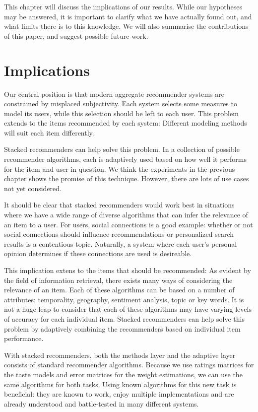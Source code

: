 \label{chap:discussion}

This chapter will discuss the implications of our results.
While our hypotheses may be answered,
it is important to clarify what we have actually found out,
and what limits there is to this knowledge.
We will also summarise the contributions of this paper,
and suggest possible future work.


\section{Implications}      

Our central position is that modern aggregate recommender systems 
are constrained by misplaced subjectivity.
Each system selects some measures to model its users, while this selection should be left to each user.
This problem extends to the items recommended by each system: 
Different modeling methods will suit each item differently.

Stacked recommenders can help solve this problem.
In a collection of possible recommender algorithms, each is adaptively used based 
on how well it performs for the item and user in question.
We think the experiments in the previous chapter shows the promise of this technique.
However, there are lots of use cases not yet considered.

It should be clear that stacked recommenders would work best in situations where
we have a wide range of diverse algorithms that can infer the relevance of an item to a user.
For users, social connections is a good example: whether or not social connections should influence
recommendations or personalized search results is a contentious topic.
Naturally, a system where each user's personal opinion determines if these connections are used is desireable.

This implication extens to the items that should be recommended:
As evident by the field of information retrieval,
there exists many ways of considering the relevance of an item. 
Each of these algorithms can be based on a number of attributes:
temporality, geography, sentiment analysis, topic or key words.
It is not a huge leap to consider that each of these algorithms may have
varying levels of accuracy for each individual item.
Stacked recommenders can help solve this problem by adaptively 
combining the recommenders based on individual item performance.

With stacked recommenders, both the methods layer and the adaptive layer consists of standard recommender algorithms.
Because we use ratings matrices for the taste models and error matrices for the weight estimations,
we can use the same algorithms for both tasks.
Using known algorithms for this new task is beneficial:
they are known to work, enjoy multiple implementations
and are already understood and battle-tested in many different systems.

